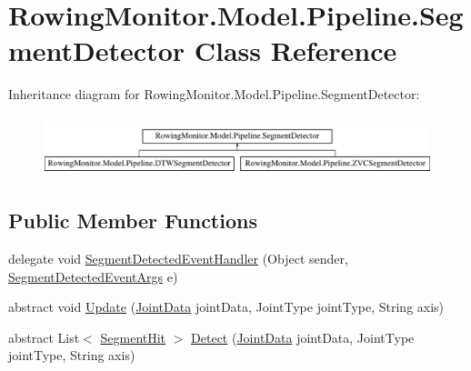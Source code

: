 \hypertarget{class_rowing_monitor_1_1_model_1_1_pipeline_1_1_segment_detector}{}\section{Rowing\+Monitor.\+Model.\+Pipeline.\+Segment\+Detector Class Reference}
\label{class_rowing_monitor_1_1_model_1_1_pipeline_1_1_segment_detector}
Inheritance diagram for Rowing\+Monitor.\+Model.\+Pipeline.\+Segment\+Detector\+:\begin{figure}[H]
\begin{center}
\leavevmode
\includegraphics[height=1.755486cm]{class_rowing_monitor_1_1_model_1_1_pipeline_1_1_segment_detector}
\end{center}
\end{figure}
\subsection*{Public Member Functions}
\begin{DoxyCompactItemize}
\item 
delegate void \hyperlink{class_rowing_monitor_1_1_model_1_1_pipeline_1_1_segment_detector_aee5283f7fa49f68c5c4195449442093c}{Segment\+Detected\+Event\+Handler} (Object sender, \hyperlink{class_rowing_monitor_1_1_model_1_1_segment_detected_event_args}{Segment\+Detected\+Event\+Args} e)
\item 
abstract void \hyperlink{class_rowing_monitor_1_1_model_1_1_pipeline_1_1_segment_detector_a24dcb2926660a6218af3052f147d82da}{Update} (\hyperlink{struct_rowing_monitor_1_1_model_1_1_util_1_1_joint_data}{Joint\+Data} joint\+Data, Joint\+Type joint\+Type, String axis)
\item 
abstract List$<$ \hyperlink{struct_rowing_monitor_1_1_model_1_1_util_1_1_segment_hit}{Segment\+Hit} $>$ \hyperlink{class_rowing_monitor_1_1_model_1_1_pipeline_1_1_segment_detector_a28a3c23d7d350c0e37e9a58ff9a4e16b}{Detect} (\hyperlink{struct_rowing_monitor_1_1_model_1_1_util_1_1_joint_data}{Joint\+Data} joint\+Data, Joint\+Type joint\+Type, String axis)
\end{DoxyCompactItemize}
